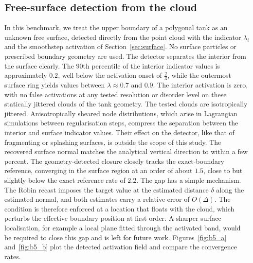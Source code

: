 \documentclass[preprint,review,12pt]{elsarticle}
\begin{document}
\subsection{Free-surface detection from the cloud}
\label{sec:b5}

In this benchmark, we treat the upper boundary of a polygonal tank as an unknown free surface, detected directly from the point cloud with the indicator $\lambda_i$ and the smoothstep activation of Section~\ref{sec:surface}.
No surface particles or prescribed boundary geometry are used.
The detector separates the interior from the surface clearly.
The $90$th percentile of the interior indicator values is approximately $0.2$, well below the activation onset of $\tfrac23$, while the outermost surface ring yields values between $\lambda\approx0.7$ and $0.9$.
The interior activation is zero, with no false activations at any tested resolution or disorder level on these statically jittered clouds of the tank geometry.
The tested clouds are isotropically jittered.
Anisotropically sheared node distributions, which arise in Lagrangian simulations between regularisation steps, compress the separation between the interior and surface indicator values.
Their effect on the detector, like that of fragmenting or splashing surfaces, is outside the scope of this study.
The recovered surface normal matches the analytical vertical direction to within a few percent.
The geometry-detected closure closely tracks the exact-boundary reference, converging in the surface region at an order of about $1.5$, close to but slightly below the exact reference rate of $2.2$.
The gap has a simple mechanism.
The Robin recast imposes the target value at the estimated distance $\delta$ along the estimated normal, and both estimates carry a relative error of $O(\Delta)$.
The condition is therefore enforced at a location that floats with the cloud, which perturbs the effective boundary position at first order.
A sharper surface localisation, for example a local plane fitted through the activated band, would be required to close this gap and is left for future work.
Figures~\ref{fig:b5_a} and~\ref{fig:b5_b} plot the detected activation field and compare the convergence rates.
\end{document}
